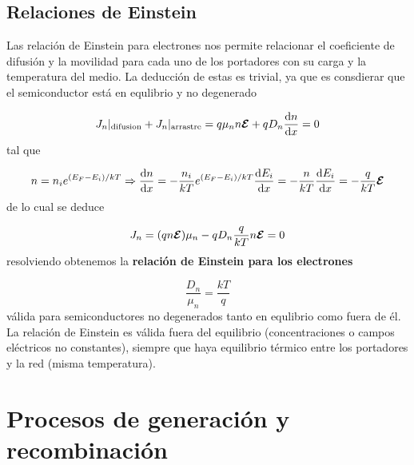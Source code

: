 \subsection{Relaciones de Einstein}

Las relación de Einstein para electrones nos permite relacionar el coeficiente de difusión y la movilidad para cada uno de los portadores con su carga y la temperatura del medio. La deducción de estas es trivial, ya que es consdierar que el semiconductor está en equlibrio y no degenerado

\begin{equation}
	J_n |_{\text{difusion}} +J_n |_{\text{arrastre}} = q\mu_n n \boldsymbol{\mathcal{E}} + qD_n\frac{\mathrm{d} n}{\mathrm{d} x} = 0
\end{equation}
tal que

\begin{equation}
	n=n_i e^{(E_F-E_i)/kT} \Rightarrow \frac{\mathrm{d} n}{\mathrm{d} x} = - \frac{n_i}{kT} e^{(E_F-E_i)/kT} \frac{\mathrm{d} E_i}{\mathrm{d} x} = - \frac{n}{kT} \frac{\mathrm{d} E_i}{\mathrm{d} x} = - \frac{q}{kT} \boldsymbol{\mathcal{E}}
\end{equation}
de lo cual se deduce

\begin{equation}
	J_n = (qn\boldsymbol{\mathcal{E}}) \mu_n - qD_n \frac{q}{kT} n \boldsymbol{\mathcal{E}} = 0
\end{equation}
resolviendo obtenemos la \textbf{relación de Einstein para los electrones}

\begin{equation}
	\frac{D_n}{\mu_n} = \frac{kT}{q}
\end{equation}
válida para semiconductores no degenerados tanto en equlibrio como fuera de él. La relación de Einstein es válida fuera del equilibrio (concentraciones o campos eléctricos no constantes), siempre que haya equilibrio térmico entre los portadores y la red (misma temperatura).


\section{Procesos de generación y recombinación}

